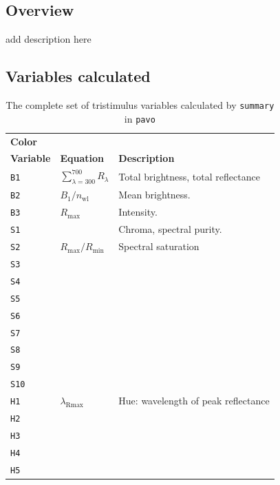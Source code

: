 \documentclass{article}
\newcommand{\pavo}{{\tt pavo}}  %
\newcommand{\code}[1]{{\tt #1}}  %
\begin{document}
\subsection{Overview}

add description here

\subsection{Variables calculated}

\begin{table}[h]
\begin{center}
\begin{tabular}{l l l} \hline
{\bf Color} & \\
{\bf Variable} & {\bf Equation} & {\bf Description} \\ 
\hline
\code{B1} & {$\sum_{\lambda={300}}^{700} R_\lambda$} & \parbox[t]{3in}{Total brightness, total reflectance}  \\
\code{B2} & {$B_\text{1}/n_\text{wl}$} & \parbox[t]{3in}{Mean brightness.} \\
\code{B3} & {$R_\text{max}$} & \parbox[t]{3in}{Intensity.} \\
\code{S1} & {} & \parbox[t]{3in}{Chroma, spectral purity.} \\
\code{S2} & {$R_\text{max}/R_\text{min}$} & \parbox[t]{3in}{Spectral saturation} \\
\code{S3} & {} & \parbox[t]{3in}{} \\
\code{S4} & {} & \parbox[t]{3in}{} \\
\code{S5} & {} & \parbox[t]{3in}{} \\
\code{S6} & {} & \parbox[t]{3in}{} \\
\code{S7} & {} & \parbox[t]{3in}{} \\
\code{S8} & {} & \parbox[t]{3in}{} \\
\code{S9} & {} & \parbox[t]{3in}{} \\
\code{S10} & {} & \parbox[t]{3in}{} \\
\code{H1} & {$\lambda_\text{Rmax}$} & \parbox[t]{3in}{Hue: wavelength of peak reflectance} \\
\code{H2} & {} & \parbox[t]{3in}{} \\
\code{H3} & {} & \parbox[t]{3in}{} \\
\code{H4} & {} & \parbox[t]{3in}{} \\
\code{H5} & {} & \parbox[t]{3in}{} \\
\hline
\end{tabular}
\end{center}
\caption{\label{table:tristim}
The complete set of tristimulus variables calculated by \code{summary} in \pavo{}}
\end{table}
\end{document}
